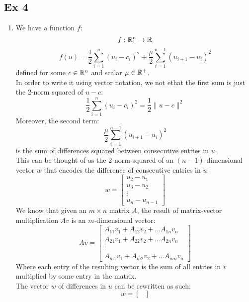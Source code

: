 \documentclass[12pt]{article}
\begin{document}
    \newpage

    \subsection*{Ex 4}

    \begin{enumerate}[label=\alph*)]
        \item 
        We have a function $f$:
        \[ f:\mathbb{R}^n \to \mathbb{R} \]
        \[ f(u) 
        = \dfrac{1}{2}\sum_{i=1}^{n}(u_i - c_i)^2
        + \dfrac{\mu}{2}\sum_{i=1}^{n-1}(u_{i+1} - u_i)^2
        \]
        defined for some $c \in \mathbb{R}^n$
        and scalar $\mu \in \mathbb{R}^+$. \\
        In order to write it using vector notation,
        we not ethat the first sum is just
        the 2-norm squared of $u - c$:
        \[ \dfrac{1}{2}\sum_{i=1}^{n}(u_i - c_i)^2
        = \dfrac{1}{2}\| u - c \|^2 \]
        Moreover, the second term:
        \[ \dfrac{\mu}{2}
        \sum_{i=1}^{n-1}(u_{i+1} - u_i)^2 \]
        is the sum of differences squared between
        consecutive entries in $u$. \\
        This can be thought of as the 2-norm squared
        of an $(n-1)$-dimensional vector $w$
        that encodes the difference of consecutive
        entries in $u$:
        \[ w = \begin{bmatrix}
            u_2 - u_1 \\
            u_3 - u_2 \\
            \vdots \\
            u_n - u_{n-1}
        \end{bmatrix} \]
        We know that given an $m \times n$
        matrix $A$,
        the result of matrix-vector
        multiplication $Av$ is
        an $m$-dimensional vector:
        \[ Av = \begin{bmatrix}
            A_{11}v_1 + A_{12}v_2 + \dots A_{1n}v_n \\
            A_{21}v_1 + A_{22}v_2 + \dots A_{2n}v_n \\
            \vdots \\
            A_{m1}v_1 + A_{m2}v_2 + \dots A_{mn}v_n
        \end{bmatrix} \]
        Where each entry of the resulting
        vector is the sum of all entries
        in $v$ multiplied by some entry
        in the matrix. \\
        The vector $w$ of differences in $u$
        can be rewritten as such:
        \[ w = \begin{bmatrix}

\end{bmatrix}\]
\end{enumerate}
\end{document}

